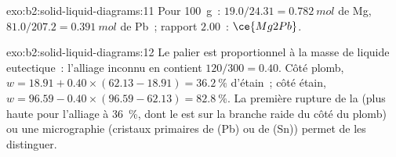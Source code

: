\begin{solution}{exo:b2:solid-liquid-diagrams:11}
Pour \qty{100}{g}~: $19.0/24.31 = \qty{0.782}{mol}$ de Mg, $81.0/207.2 =
\qty{0.391}{mol}$ de Pb~; rapport $2.00$~: $\ce{Mg2Pb}$.
\end{solution}

\begin{solution}{exo:b2:solid-liquid-diagrams:12}
Le palier est proportionnel à la masse de liquide eutectique~: l'alliage inconnu en contient
$120/300 = 0.40$. Côté plomb, $w = 18.91 + 0.40 \times (62.13 -
18.91) = 36.2~\%$ d'étain~; côté étain, $w = 96.59 - 0.40 \times (96.59 - 62.13) =
82.8~\%$. La première rupture de la  (plus haute pour l'alliage à 36~\%,
dont le  est sur la branche raide du côté du plomb) ou une micrographie (cristaux primaires
de (Pb) ou de (Sn)) permet de les distinguer.
\end{solution}

